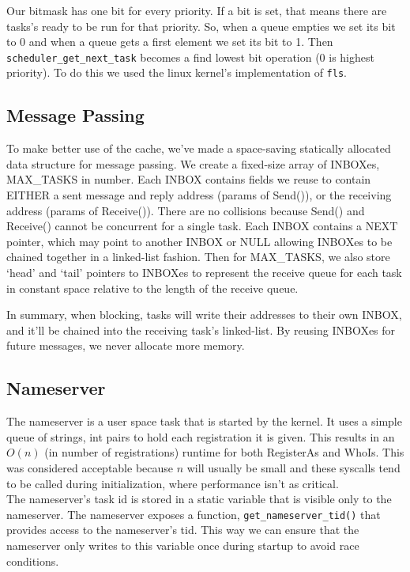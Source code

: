 \documentclass[letterpaper]{article}
\begin{document}
Our bitmask has one bit for every priority. If a bit is set, that means there are tasks's ready to be run for that priority. So, when a queue empties we set its bit to 0 and when a queue gets a first element we set its bit to 1. Then {\tt scheduler\_get\_next\_task} becomes a find lowest bit operation (0 is highest priority). To do this we used the linux kernel's implementation of {\tt fls}.

\subsection{Message Passing}

To make better use of the cache, we've made a space-saving statically allocated data structure for message passing. We create a fixed-size array of INBOXes, MAX\_TASKS in number. Each INBOX contains fields we reuse to contain EITHER a sent message and reply address (params of Send()), or the receiving address (params of Receive()). There are no collisions because Send() and Receive() cannot be concurrent for a single task. Each INBOX contains a NEXT pointer, which may point to another INBOX or NULL allowing INBOXes to be chained together in a linked-list fashion. Then for MAX\_TASKS, we also store `head' and `tail' pointers to INBOXes to represent the receive queue for each task in constant space relative to the length of the receive queue.

In summary, when blocking, tasks will write their addresses to their own INBOX, and it'll be chained into the receiving task's linked-list. By reusing INBOXes for future messages, we never allocate more memory.

\subsection{Nameserver}

The nameserver is a user space task that is started by the kernel. It uses a simple queue of strings, int pairs to hold each registration it is given. This results in an $O(n)$ (in number of registrations) runtime for both RegisterAs and WhoIs. This was considered acceptable because $n$ will usually be small and these syscalls tend to be called during initialization, where performance isn't as critical. \\

The nameserver's task id is stored in a static variable that is visible only to the nameserver. The nameserver exposes a function, {\tt get\_nameserver\_tid()} that provides access to the nameserver's tid. This way we can ensure that the nameserver only writes to this variable once during startup to avoid race conditions. \\
\end{document}
